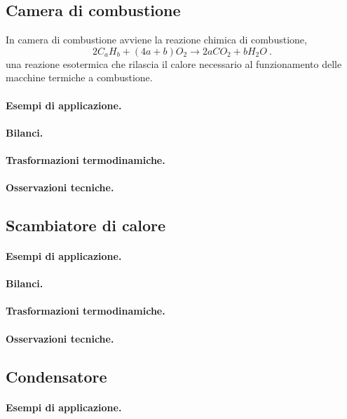 \subsection{Camera di combustione}
In camera di combustione avviene la reazione chimica di combustione,
\begin{equation}
    2 C_a H_b + (4a+b) O_2 \rightarrow 2a CO_2 + b H_2 O \ .
\end{equation}
una reazione esotermica che rilascia il calore necessario al funzionamento delle macchine termiche a combustione.
\paragraph{Esempi di applicazione.}
\paragraph{Bilanci.}
\paragraph{Trasformazioni termodinamiche.}
\paragraph{Osservazioni tecniche.}

\subsection{Scambiatore di calore}
\paragraph{Esempi di applicazione.}
\paragraph{Bilanci.}
\paragraph{Trasformazioni termodinamiche.}
\paragraph{Osservazioni tecniche.}

\subsection{Condensatore}
\paragraph{Esempi di applicazione.}
